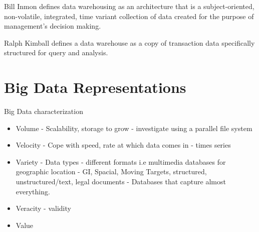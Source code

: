 Bill Inmon defines data warehousing as an architecture that is a subject-oriented, non-volatile, integrated, time variant collection of data created for the purpose of management’s decision making. 

Ralph Kimball defines a data warehouse as a copy of transaction data specifically structured for query and analysis.


\section{Big Data Representations}

Big Data characterization
\begin{itemize}
	\item Volume - Scalability, storage to grow - investigate using a parallel file system
	\item Velocity - Cope with speed, rate at which data comes in - times series
	\item Variety - Data types - different formats i.e multimedia databases for geographic location - GI, Spacial, Moving Targets, structured, unstructured/text, legal documents - Databases that capture almost everything.
	\item Veracity - validity
	\item Value
\end{itemize}

